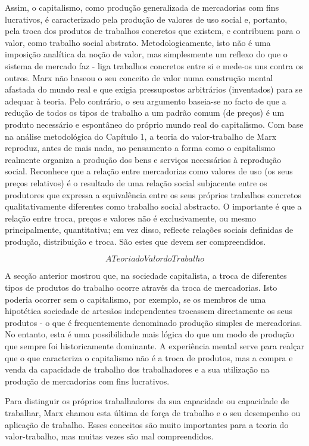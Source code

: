  \par 
Assim, o capitalismo, como produção generalizada de mercadorias com fins lucrativos, é caracterizado pela produção de valores de uso social e, portanto, pela troca dos produtos de trabalhos concretos que existem, e contribuem para o valor, como trabalho social abstrato. Metodologicamente, isto não é uma imposição analítica da noção de valor, mas simplesmente um reflexo do que o sistema de mercado faz - liga trabalhos concretos entre si e mede-os uns contra os outros. Marx não baseou o seu conceito de valor numa construção mental afastada do mundo real e que exigia pressupostos arbitrários (inventados) para se adequar à teoria. Pelo contrário, o seu argumento baseia-se no facto de que a redução de todos os tipos de trabalho a um padrão comum (de preços) é um produto necessário e espontâneo do próprio mundo real do capitalismo. Com base na análise metodológica do Capítulo 1, a teoria do valor-trabalho de Marx reproduz, antes de mais nada, no pensamento a forma como o capitalismo realmente organiza a produção dos bens e serviços necessários à reprodução social. Reconhece que a relação entre mercadorias como valores de uso (os seus preços relativos) é o resultado de uma relação social subjacente entre os produtores que expressa a equivalência entre os seus próprios trabalhos concretos qualitativamente diferentes como trabalho social abstracto. O importante é que a relação entre troca, preços e valores não é exclusivamente, ou mesmo principalmente, quantitativa; em vez disso, reflecte relações sociais definidas de produção, distribuição e troca. São estes que devem ser compreendidos.
 \par 
\[A Teoria do Valor do Trabalho\]
 \par 
A secção anterior mostrou que, na sociedade capitalista, a troca de diferentes tipos de produtos do trabalho ocorre através da troca de mercadorias. Isto poderia ocorrer sem o capitalismo, por exemplo, se os membros de uma hipotética sociedade de artesãos independentes trocassem directamente os seus produtos - o que é frequentemente denominado produção simples de mercadorias. No entanto, esta é uma possibilidade mais lógica do que um modo de produção que sempre foi historicamente dominante. A experiência mental serve para realçar que o que caracteriza o capitalismo não é a troca de produtos, mas a compra e venda da capacidade de trabalho dos trabalhadores e a sua utilização na produção de mercadorias com fins lucrativos.
 \par 
Para distinguir os próprios trabalhadores da sua capacidade ou capacidade de trabalhar, Marx chamou esta última de força de trabalho e o seu desempenho ou aplicação de trabalho. Esses conceitos são muito importantes para a teoria do valor-trabalho, mas muitas vezes são mal compreendidos.
